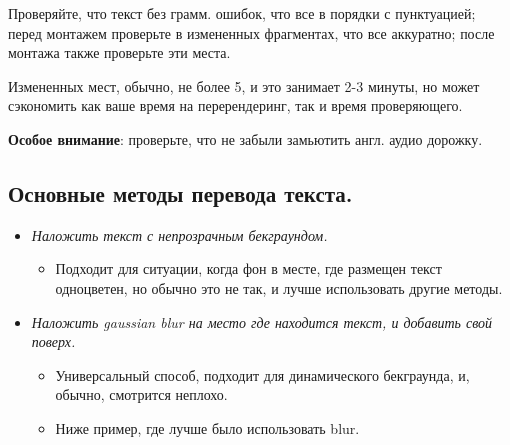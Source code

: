 \documentclass[
a4paper, %
12pt, %
article,
onecolumn, %
openany, %
]{memoir}
\begin{document}
Проверяйте, что текст без грамм. ошибок,
что все в порядки с пунктуацией;
перед монтажем проверьте в измененных фрагментах,
что все аккуратно;
после монтажа также проверьте эти места.

Измененных мест, обычно, не более 5, и это занимает 2-3 минуты,
но может сэкономить как ваше время на перерендеринг,
так и время проверяющего.

\textbf{Особое внимание}: проверьте, что не забыли замьютить
англ. аудио дорожку.

\subsection{Основные методы перевода текста.}

\begin{itemize}
    \item \emph{Наложить текст с непрозрачным бекграундом.}

        \begin{itemize}
            \item Подходит для ситуации, когда фон в месте, где размещен текст
                одноцветен, но обычно это не так, и лучше использовать другие методы.
        \end{itemize}

    \item \emph{Наложить gaussian blur на место где находится текст, и добавить
        свой поверх.}

        \begin{itemize}
            \item Универсальный способ, подходит для
                динамического бекграунда, и, обычно, смотрится неплохо.

            \item Ниже пример, где лучше было использовать blur.


\end{itemize}
\end{itemize}
\end{document}
